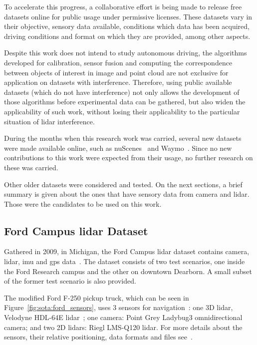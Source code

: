 To accelerate this progress, a collaborative effort is being made to release free datasets online for public usage under permissive licenses. These datasets vary in their objective, sensory data available, conditions which data has been acquired, driving conditions and format on which they are provided, among other aspects. 

Despite this work does not intend to study autonomous driving, the algorithms developed for calibration, sensor fusion and computing the correspondence between objects of interest in image and point cloud are not exclusive for application on datasets with interference. Therefore, using public available datasets (which do not have interference) not only allows the development of those algorithms before experimental data can be gathered, but also widen the applicability of such work, without losing their applicability to the particular situation of \ac{lidar} interference.

During the months when this research work was carried, several new datasets were made available online, such as nuScenes~\cite{nuScenes2019} and Waymo~\cite{Waymo}. Since no new contributions to this work were expected from their usage, no further research on these was carried. 

Other older datasets were considered and tested. On the next sections, a brief summary is given about the ones that have sensory data from camera and \ac{lidar}. Those were the candidates to be used on this work.

\subsection{Ford Campus \acs{lidar} Dataset}
Gathered in 2009, in Michigan, the Ford Campus \ac{lidar} dataset contains camera, \ac{lidar}, \acf{imu} and \acf{gps} data~\cite{Pandey2011}. The dataset consists of two test scenarios, one inside the Ford Research campus and the other on downtown Dearborn. A small subset of the former test scenario is also provided.

The modified Ford F-250 pickup truck, which can be seen in Figure~\ref{fig:sota:ford_sensors}, uses 3 sensors for navigation~\cite{Pandey2011}: one 3D \ac{lidar}, Velodyne HDL-64E \ac{lidar}~\cite{VelodyneHDL64}; one camera: Point Grey Ladybug3 omnidirectional camera; and two 2D \acp{lidar}: Riegl LMS-Q120 lidar. For more details about the sensors, their relative positioning, data formats and files see~\cite{Pandey2011}.


